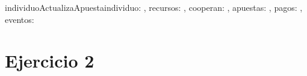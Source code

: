 \documentclass[10pt,a4paper]{article}
\begin{document}
\begin{proc}{individuoActualizaApuesta}{\In individuo: \nat, \In recursos: \TLista{\float} , \In cooperan: \TLista{\bool} , \Inout apuestas: \TLista{\TLista{\float}}, \In pagos: \TLista{\TLista{\float}} , \In eventos: \TLista{\TLista{\nat}} }{}


\end{proc}

\section{Ejercicio 2}
\end{document}
